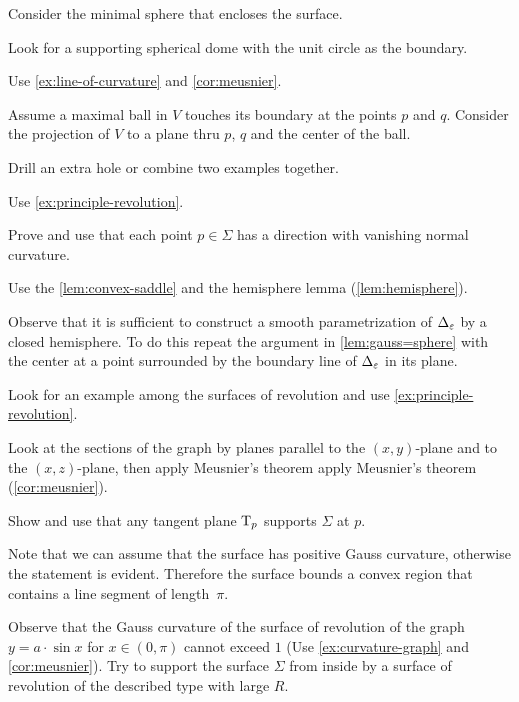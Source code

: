 Consider the minimal sphere that encloses the surface.

Look for a supporting spherical dome with the unit circle as the boundary.

 Use \ref{ex:line-of-curvature} and \ref{cor:meusnier}.

Assume a maximal ball in $V$ touches its boundary at the points $p$ and $q$.
Consider the projection of $V$ to a plane thru $p$, $q$ and the center of the ball. 

 Drill an extra hole or combine two examples together.

 Use \ref{ex:principle-revolution}.

 Prove and use that each point $p\in\Sigma$ has a direction with vanishing normal curvature.

 Use the \ref{lem:convex-saddle} and the hemisphere lemma (\ref{lem:hemisphere}).

 Observe that it is sufficient to construct a smooth parametrization of $\Delta_\varepsilon$ by a closed hemisphere.
To do this repeat the argument in \ref{lem:gauss=sphere} with the center at a point surrounded by the boundary line of $\Delta_\varepsilon$ in its plane.

 Look for an example among the surfaces of revolution and use \ref{ex:principle-revolution}.

 Look at the sections of the graph by planes parallel to the $(x,y)$-plane and to the $(x,z)$-plane, then apply Meusnier’s theorem apply Meusnier's theorem (\ref{cor:meusnier}).

 Show and use that any tangent plane $\mathrm{T}_p$ supports $\Sigma$ at $p$.

Note that we can assume that the surface has positive Gauss curvature, otherwise the statement is evident.
Therefore the surface bounds a convex region that contains a line segment of length~$\pi$.

Observe that the Gauss curvature of the surface of revolution of the graph $y=a\cdot \sin x$ for $x\in(0,\pi)$ cannot exceed $1$ (Use \ref{ex:curvature-graph} and \ref{cor:meusnier}).
Try to support the surface $\Sigma$ from inside by a surface of revolution of the described type with large $R$. 

